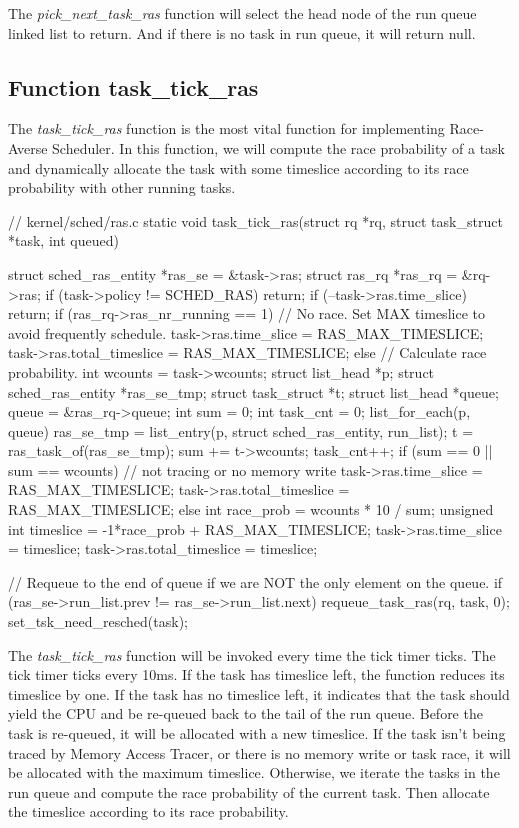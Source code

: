 The \textit{pick\_next\_task\_ras} function will select the head node of the run queue linked list to return. And if there is no task in run queue, it will return null.

\subsection{Function task\_tick\_ras}

The \textit{task\_tick\_ras} function is the most vital function for implementing Race-Averse Scheduler. In this function, we will compute the race probability of a task and dynamically allocate the task with some timeslice according to its race probability with other running tasks.

\begin{codeblock}[language=C]
// kernel/sched/ras.c
static void
task_tick_ras(struct rq *rq, struct task_struct *task, int queued)
{
	struct sched_ras_entity *ras_se = &task->ras;
	struct ras_rq *ras_rq = &rq->ras;
	if (task->policy != SCHED_RAS)
		return;		
	if (--task->ras.time_slice)
		return;
	if (ras_rq->ras_nr_running == 1){
		// No race. Set MAX timeslice to avoid frequently schedule.
		task->ras.time_slice = RAS_MAX_TIMESLICE;
		task->ras.total_timeslice = RAS_MAX_TIMESLICE;
	} else {
		// Calculate race probability.
		int wcounts = task->wcounts;
		struct list_head *p;
		struct sched_ras_entity *ras_se_tmp;
		struct task_struct *t;
		struct list_head *queue;
		queue = &ras_rq->queue;
		int sum = 0;
		int task_cnt = 0;
		list_for_each(p, queue)
		{
			ras_se_tmp = list_entry(p, struct sched_ras_entity, run_list);
			t = ras_task_of(ras_se_tmp);
			sum += t->wcounts;
			task_cnt++;
		}
		if (sum == 0 || sum == wcounts) {
			// not tracing or no memory write
			task->ras.time_slice = RAS_MAX_TIMESLICE;
			task->ras.total_timeslice = RAS_MAX_TIMESLICE;
		} else {
			int race_prob = wcounts * 10 / sum;
			unsigned int timeslice = -1*race_prob + RAS_MAX_TIMESLICE;
			task->ras.time_slice = timeslice;
			task->ras.total_timeslice = timeslice;
		}
	}
	
	// Requeue to the end of queue if we are NOT the only element on the queue.
	if (ras_se->run_list.prev != ras_se->run_list.next){
        requeue_task_ras(rq, task, 0);
        set_tsk_need_resched(task);
    }
}
\end{codeblock}

The \textit{task\_tick\_ras} function will be invoked every time the tick timer ticks. The tick timer ticks every 10ms. If the task has timeslice left, the function reduces its timeslice by one. If the task has no timeslice left, it indicates that the task should yield the CPU and be re-queued back to the tail of the run queue. Before the task is re-queued, it will be allocated with a new timeslice. If the task isn't being traced by Memory Access Tracer, or there is no memory write or task race, it will be allocated with the maximum timeslice. Otherwise, we iterate the tasks in the run queue and compute the race probability of the current task. Then allocate the timeslice according to its race probability.


